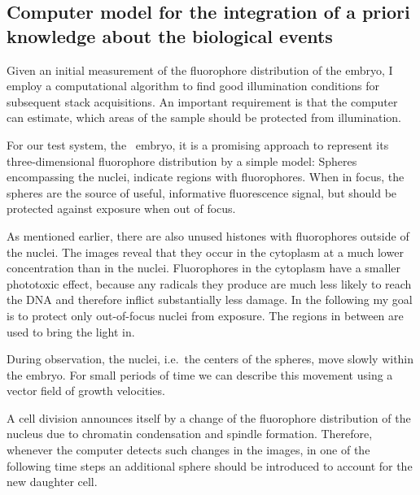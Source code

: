 \subsection{Computer model for the integration of a priori knowledge
about the biological events} 
Given an initial measurement of the fluorophore distribution of the
embryo, I employ a computational algorithm to find good illumination
conditions for subsequent stack acquisitions. An important requirement
is that the computer can estimate, which areas of the sample should be
protected from illumination.

For our test system, the \celegans\ embryo, it is a promising approach
to represent its three-dimensional fluorophore distribution by a
simple model: Spheres encompassing the nuclei, indicate regions with
fluorophores. When in focus, the spheres are the source of useful,
informative fluorescence signal, but should be protected against
exposure when out of focus.

As mentioned earlier, there are also unused histones with
fluorophores outside of the nuclei. The images reveal that they occur
in the cytoplasm at a much lower concentration than in the
nuclei. Fluorophores in the cytoplasm have a smaller phototoxic
effect, because any radicals they produce are much less likely to
reach the DNA and therefore inflict substantially less damage.  In the
following my goal is to protect only out-of-focus nuclei from
exposure. The regions in between are used to bring the light in.


During observation, the nuclei, i.e.\ the centers of the spheres, move
slowly within the embryo. For small periods of time we can describe
this movement using a vector field of growth velocities.

A cell division announces itself by a change of the fluorophore
distribution of the nucleus due to chromatin condensation and spindle
formation. Therefore, whenever the computer detects such changes in
the images, in one of the following time steps an additional sphere
should be introduced to account for the new daughter cell.

